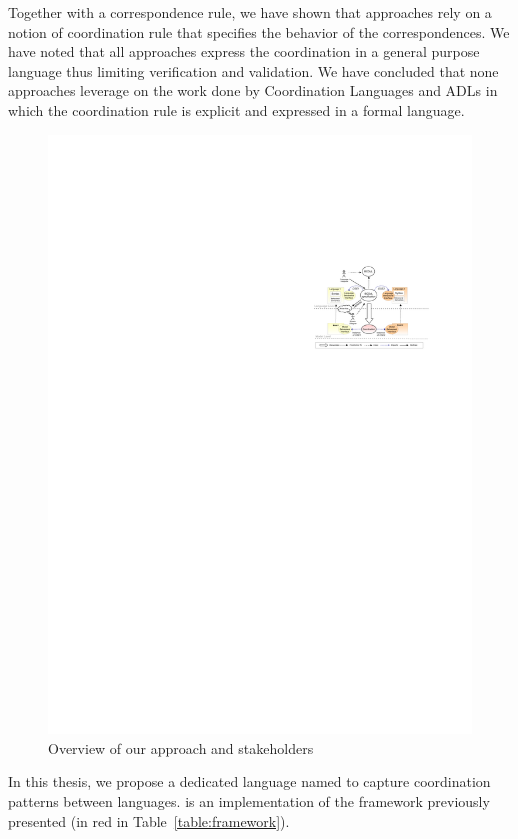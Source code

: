 Together with a correspondence rule, we have shown that approaches rely on a notion of coordination rule that specifies the behavior of the correspondences. We have noted that all approaches express the coordination in a general purpose language thus limiting verification and validation. We have concluded that none approaches leverage on the work done by Coordination Languages and ADLs in which the coordination rule is explicit and expressed in a formal language.  

\begin{figure}
	\begin{center}
		\includegraphics[width=.7\textwidth]{framework/figs/bcool}
		\caption{Overview of our approach and stakeholders}
		\label{fig:bcool}
	\end{center}
\end{figure}

In this thesis, we propose a dedicated language named \bcool to capture coordination patterns between languages. \bcool is an implementation of the framework previously presented (in red in Table~\ref{table:framework}).  

